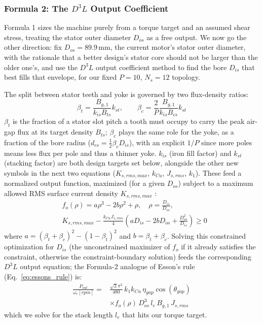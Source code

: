 \documentclass[10pt,final,journal,a4paper,oneside,twocolumn]{IEEEtran}
\begin{document}
\subsubsection{Formula 2: The $D^3L$ Output Coefficient}
Formula 1 sizes the machine purely from a torque target and an assumed shear stress, treating the stator outer diameter $D_{os}$ as a free output. We now go the other direction: fix $D_{os}=89.9\,\text{mm}$, the current motor's stator outer diameter, with the rationale that a better design's stator core should not be larger than the older one's, and use the $D^3L$ output coefficient method \cite{LucaLecture6} to find the bore $D_{is}$ that best fills that envelope, for our fixed $P=10$, $N_s=12$ topology.

The split between stator teeth and yoke is governed by two flux-density ratios:
\begin{equation}
\label{eq:beta_ratios}
\beta_t = \frac{B_{g,1}}{k_{is}B_{ts}}k_{st}, \qquad \beta_c = \frac{2}{P}\frac{B_{g,1}}{k_{is}B_{cs}}k_{st}
\end{equation}
$\beta_t$ is the fraction of a stator slot pitch a tooth must occupy to carry the peak air-gap flux at its target density $B_{ts}$; $\beta_c$ plays the same role for the yoke, as a fraction of the bore radius ($d_{cs}=\tfrac{1}{2}\beta_c D_{is}$), with an explicit $1/P$ since more poles means less flux per pole and thus a thinner yoke. $k_{is}$ (iron fill factor) and $k_{st}$ (stacking factor) are both design targets set below, alongside the other new symbols in the next two equations ($K_{s,rms,max}$, $k_{Cu}$, $J_{s,rms}$, $k_1$). These feed a normalized output function, maximized (for a given $D_{os}$) subject to a maximum allowed RMS surface current density $K_{s,rms,max}$ \cite{LucaLecture6}:
\begin{equation}
\label{eq:fo_constraint}
\begin{aligned}
&f_o(\rho) = a\rho^3 - 2b\rho^2 + \rho, \quad \rho = \frac{D_{is}}{D_{os}}, \\[2pt]
&K_{s,rms,max} - \frac{k_{Cu}J_{s,rms}}{4}\left(aD_{is}-2bD_{os}+\frac{D_{os}^2}{D_{is}}\right) \geq 0
\end{aligned}
\end{equation}
where $a=(\beta_t+\beta_c)^2-(1-\beta_t)^2$ and $b=\beta_t+\beta_c$. Solving this constrained optimization for $D_{is}$ (the unconstrained maximizer of $f_o$ if it already satisfies the constraint, otherwise the constraint-boundary solution) feeds the corresponding $D^3L$ output equation; the Formula-2 analogue of Esson's rule (Eq.~\ref{eq:essons_rule}) is:
\begin{equation}
\label{eq:essons_rule_d3l}
\begin{split}
\frac{P_{out}}{\omega_r[rpm]} = {}& \frac{\sqrt{2}\pi^2}{480}\,k_1 k_{Cu}\,\eta_{gap}\cos(\theta_{gap}) \\
&\times f_o(\rho)\,D_{os}^3\, l_e\, B_{g,1}\,J_{s,rms}
\end{split}
\end{equation}
which we solve for the stack length $l_e$ that hits our torque target.
\end{document}
